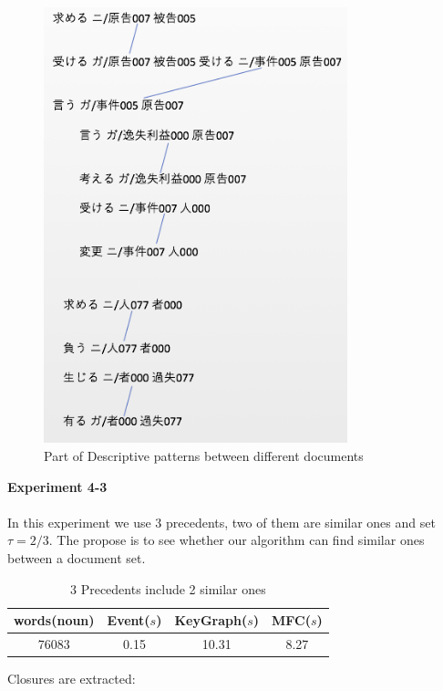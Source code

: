 \begin{figure}[!h]
\centering
\includegraphics[width=250pt]{./pictures/0403-2.png}
\caption{Part of Descriptive patterns between different documents}
\end{figure}
\newpage
\textbf{Experiment 4-3}
\\ \\
In this experiment we use 3 precedents, two of them are similar ones and set $\tau = 2/3$. The propose is to see whether our algorithm can find similar ones between a document set.
\begin{table}[!h]
\centering
\begin{tabular}{cccc}
\hline
words(noun)&Event($s$)&KeyGraph($s$)&MFC($s$)\\
\hline
76083&0.15&10.31&8.27\\
\hline
\end{tabular}
\caption{3 Precedents include 2 similar ones}
\end{table}
Closures are extracted:
